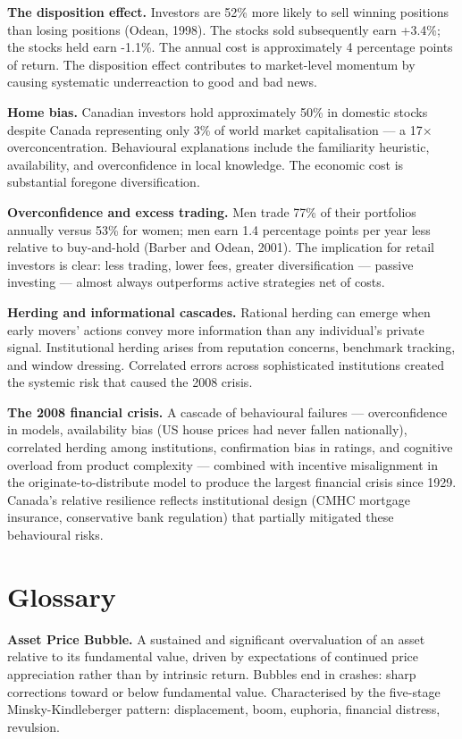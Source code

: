 \documentclass[12pt, letterpaper]{article}
\begin{document}
\textbf{The disposition effect.} Investors are 52\% more likely to sell winning positions than losing positions (Odean, 1998). The stocks sold subsequently earn +3.4\%; the stocks held earn -1.1\%. The annual cost is approximately 4 percentage points of return. The disposition effect contributes to market-level momentum by causing systematic underreaction to good and bad news.

\textbf{Home bias.} Canadian investors hold approximately 50\% in domestic stocks despite Canada representing only 3\% of world market capitalisation --- a 17$\times$ overconcentration. Behavioural explanations include the familiarity heuristic, availability, and overconfidence in local knowledge. The economic cost is substantial foregone diversification.

\textbf{Overconfidence and excess trading.} Men trade 77\% of their portfolios annually versus 53\% for women; men earn 1.4 percentage points per year less relative to buy-and-hold (Barber and Odean, 2001). The implication for retail investors is clear: less trading, lower fees, greater diversification --- passive investing --- almost always outperforms active strategies net of costs.

\textbf{Herding and informational cascades.} Rational herding can emerge when early movers' actions convey more information than any individual's private signal. Institutional herding arises from reputation concerns, benchmark tracking, and window dressing. Correlated errors across sophisticated institutions created the systemic risk that caused the 2008 crisis.

\textbf{The 2008 financial crisis.} A cascade of behavioural failures --- overconfidence in models, availability bias (US house prices had never fallen nationally), correlated herding among institutions, confirmation bias in ratings, and cognitive overload from product complexity --- combined with incentive misalignment in the originate-to-distribute model to produce the largest financial crisis since 1929. Canada's relative resilience reflects institutional design (CMHC mortgage insurance, conservative bank regulation) that partially mitigated these behavioural risks.

\medskip


\section*{Glossary}


\textbf{Asset Price Bubble.} A sustained and significant overvaluation of an asset relative to its fundamental value, driven by expectations of continued price appreciation rather than by intrinsic return. Bubbles end in crashes: sharp corrections toward or below fundamental value. Characterised by the five-stage Minsky-Kindleberger pattern: displacement, boom, euphoria, financial distress, revulsion.
\end{document}
